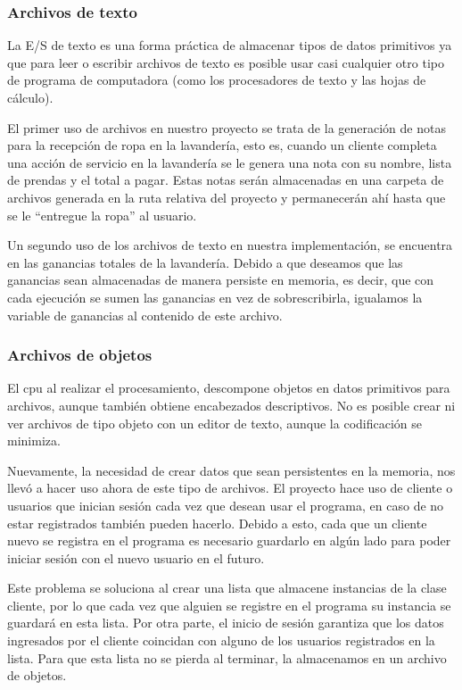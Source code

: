 \documentclass[12pt]{article}
\begin{document}
\subsubsection{Archivos de texto}
La E/S de texto es una forma práctica de almacenar tipos de datos primitivos ya que para leer o escribir archivos de texto es posible usar casi cualquier otro tipo de programa de computadora (como los procesadores de texto y las hojas de cálculo).

\par El primer uso de archivos en nuestro proyecto se trata de la generación de notas para la recepción de ropa en la lavandería, esto es, cuando un cliente completa una acción de servicio en la lavandería se le genera una nota con su nombre, lista de prendas y el total a pagar. Estas notas serán almacenadas en una carpeta de archivos generada en la ruta relativa del proyecto y permanecerán ahí hasta que se le ``entregue la ropa'' al usuario.

\par Un segundo uso de los archivos de texto en nuestra implementación, se encuentra en las ganancias totales de la lavandería. Debido a que deseamos que las ganancias sean almacenadas de manera persiste en memoria, es decir, que con cada ejecución se sumen las ganancias en vez de sobrescribirla, igualamos la variable de ganancias al contenido de este archivo.

\subsubsection{Archivos de objetos}
El cpu al realizar el procesamiento, descompone objetos en datos primitivos para archivos, aunque también obtiene encabezados descriptivos. No es posible crear ni ver archivos de tipo objeto con un editor de texto, aunque la codificación se minimiza.

\par Nuevamente, la necesidad de crear datos que sean persistentes en la memoria, nos llevó a hacer uso ahora de este tipo de archivos. El proyecto hace uso de cliente o usuarios que inician sesión cada vez que desean usar el programa, en caso de no estar registrados también pueden hacerlo. Debido a esto, cada que un cliente nuevo se registra en el programa es necesario guardarlo en algún lado para poder iniciar sesión con el nuevo usuario en el futuro.

\par Este problema se soluciona al crear una lista que almacene instancias de la clase cliente, por lo que cada vez que alguien se registre en el programa su instancia se guardará en esta lista. Por otra parte, el inicio de sesión garantiza que los datos ingresados por el cliente coincidan con alguno de los usuarios registrados en la lista. Para que esta lista no se pierda al terminar, la almacenamos en un archivo de objetos.
\end{document}
